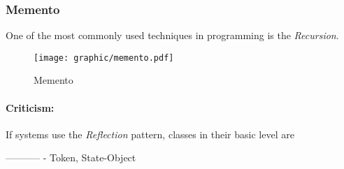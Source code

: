 %
%
%
%
%
%
%

\subsubsection{Memento}
\label{memento_heading}

One of the most commonly used techniques in programming is the \emph{Recursion}.

\begin{figure}[ht]
    \begin{center}
        \texttt{[image: graphic/memento.pdf]}
        \caption{Memento}
        \label{memento_figure}
    \end{center}
\end{figure}

\paragraph{Criticism:}
If systems use the \emph{Reflection} pattern, classes in their basic level are

-----------
- Token, State-Object
